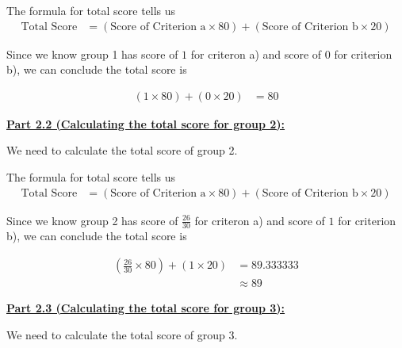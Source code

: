 \documentclass[12pt]{article}
\begin{document}
\begin{mdframed}
\begin{itemize}
\begin{mdframed}
            \bigskip

            The formula for total score tells us
            \setcounter{equation}{0}
            \begin{align}
                \text{Total Score} &= (\text{Score of Criterion a} \times 80) + (\text{Score of Criterion b} \times 20)
            \end{align}

            \bigskip

            Since we know group 1 has score of $1$ for criteron a) and score of $0$ for
            criterion b), we can conclude the total score is

            \begin{align}
                (1 \times 80) + (0 \times 20) &= 80
            \end{align}

            \bigskip

            \underline{\textbf{Part 2.2 (Calculating the total score for group 2):}}

            \bigskip

            We need to calculate the total score of group 2.

            \bigskip

            The formula for total score tells us
            \setcounter{equation}{0}
            \begin{align}
                \text{Total Score} &= (\text{Score of Criterion a} \times 80) + (\text{Score of Criterion b} \times 20)
            \end{align}

            \bigskip

            Since we know group 2 has score of $\frac{26}{30}$ for criteron a) and score of $1$ for
            criterion b), we can conclude the total score is

            \begin{align}
                (\frac{26}{30} \times 80) + (1 \times 20) &= 89.333333\\
                &\approx 89
            \end{align}

            \bigskip

            \underline{\textbf{Part 2.3 (Calculating the total score for group 3):}}

            \bigskip

            We need to calculate the total score of group 3.


\end{mdframed}
\end{itemize}
\end{mdframed}
\end{document}
